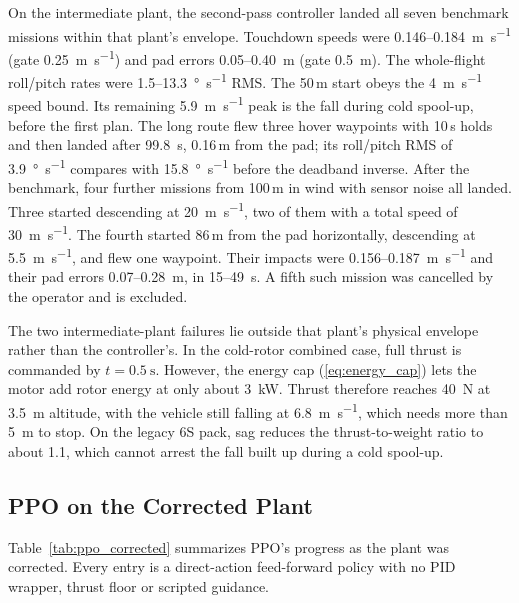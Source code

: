 \documentclass[conference]{IEEEtran}
\begin{document}
On the intermediate plant, the second-pass controller landed all seven benchmark missions within that plant's envelope. Touchdown speeds were 0.146--\SI{0.184}{\metre\per\second} (gate \SI{0.25}{\metre\per\second}) and pad errors 0.05--\SI{0.40}{\metre} (gate \SI{0.5}{\metre}). The whole-flight roll/pitch rates were 1.5--\SI{13.3}{\degree\per\second} RMS. The 50\,m start obeys the \SI{4}{\metre\per\second} speed bound. Its remaining \SI{5.9}{\metre\per\second} peak is the fall during cold spool-up, before the first plan. The long route flew three hover waypoints with 10\,s holds and then landed after \SI{99.8}{\second}, 0.16\,m from the pad; its roll/pitch RMS of \SI{3.9}{\degree\per\second} compares with \SI{15.8}{\degree\per\second} before the deadband inverse. After the benchmark, four further missions from 100\,m in wind with sensor noise all landed. Three started descending at \SI{20}{\metre\per\second}, two of them with a total speed of \SI{30}{\metre\per\second}. The fourth started 86\,m from the pad horizontally, descending at \SI{5.5}{\metre\per\second}, and flew one waypoint. Their impacts were 0.156--\SI{0.187}{\metre\per\second} and their pad errors 0.07--\SI{0.28}{\metre}, in 15--\SI{49}{\second}. A fifth such mission was cancelled by the operator and is excluded.

The two intermediate-plant failures lie outside that plant's physical envelope rather than the controller's. In the cold-rotor combined case, full thrust is commanded by $t = \SI{0.5}{\second}$. However, the energy cap (\ref{eq:energy_cap}) lets the motor add rotor energy at only about \SI{3}{\kilo\watt}. Thrust therefore reaches \SI{40}{\newton} at \SI{3.5}{\metre} altitude, with the vehicle still falling at \SI{6.8}{\metre\per\second}, which needs more than \SI{5}{\metre} to stop. On the legacy 6S pack, sag reduces the thrust-to-weight ratio to about 1.1, which cannot arrest the fall built up during a cold spool-up.

\subsection{PPO on the Corrected Plant}
\label{sec:ppo_corrected}

Table~\ref{tab:ppo_corrected} summarizes PPO's progress as the plant was corrected. Every entry is a direct-action feed-forward policy with no PID wrapper, thrust floor or scripted guidance.
\end{document}

